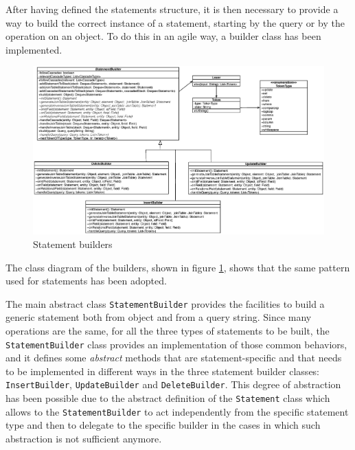 \newparagraph After having defined the statements structure, it is then necessary to provide a way to build the correct instance of a statement, starting by the query or by the operation on an object.
To do this in an agile way, a builder class has been implemented.

\begin{figure}[tbh]
  \includegraphics[width=16cm]{images/builders}
  \caption{Statement builders}
  \label{fig:builders}
\end{figure} 

\noindent The class diagram of the builders, shown in figure \ref{fig:builders}, shows that the same pattern used for statements has been adopted.

\noindent The main abstract class \texttt{StatementBuilder} provides the facilities to build a generic statement both from object and from a query string.
Since many operations are the same, for all the three types of statements to be built, the \texttt{StatementBuilder} class provides an implementation of those common behaviors, and it defines some \textit{abstract} methods that are statement-specific and that needs to be implemented in different ways in the three statement builder classes: \texttt{InsertBuilder}, \texttt{UpdateBuilder} and \texttt{DeleteBuilder}.
This degree of abstraction has been possible due to the abstract definition of the \texttt{Statement} class which allows to the \texttt{StatementBuilder} to act independently from the specific statement type and then to delegate to the specific builder in the cases in which such abstraction is not sufficient anymore.

